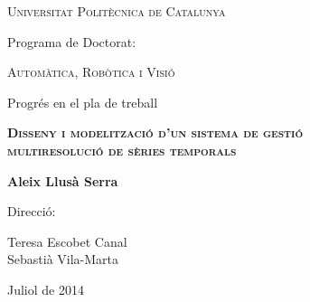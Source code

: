 \begin{titlepage}
  \begin{center} 

   

    {\Large \scshape Universitat Politècnica de Catalunya} \vskip 1cm 

    {Programa de Doctorat:} \vskip 0.5cm 
    
    {\scshape Automàtica, Robòtica i Visió} \vfill%

    {Progrés en el pla de treball} \vskip 1cm 
    
    {\scshape \bfseries \Large Disseny i modelització d'un sistema de gestió\\
       multiresolució de sèries temporals} \vskip 2cm

    {\bfseries Aleix Llusà Serra} \vfill%

    {Direcció:}
       
    {Teresa Escobet Canal \\
    Sebastià Vila-Marta}  \vskip 1cm 


    {Juliol de 2014}

\end{center}
\end{titlepage}





  






